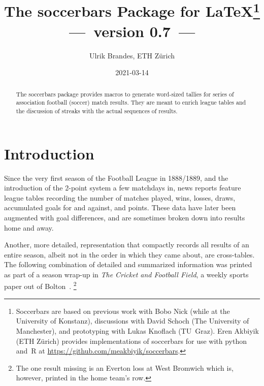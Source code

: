 \documentclass[a4paper,12pt]{ltxdoc}
\title{The \textsf{soccerbars} Package for \LaTeX\thanks{%
Soccerbars are based on
previous work with Bobo Nick (while at the University of Konstanz),
discussions with David Schoch (The University of Manchester),
and prototyping with Lukas Knoflach (TU~Graz).
Eren Akbiyik (ETH Z\"urich) provides implementations of soccerbars
for use with python and~R at \url{https://github.com/meakbiyik/soccerbars}.}\\
\normalsize ---~version 0.7~---}
\author{Ulrik Brandes, ETH Zürich}
\date{2021-03-14}
\begin{document}
\maketitle
\begin{abstract}
The \textsf{soccerbars} package provides macros
to generate word-sized tallies
for series of association football (soccer) match results. 
They are meant to enrich league tables and the discussion of streaks
with the actual sequences of results.
\end{abstract}
\tableofcontents
\clearpage

\section{Introduction}

Since the very first season of the Football League in 1888/1889, 
and the introduction of the 2-point system a few matchdays in,
news reports feature league tables 
recording the number of matches played,
wins, losses, draws, accumulated goals for and against, and points.
These data have later been augmented with goal differences,
and are sometimes broken down into results home and away.

Another, more detailed, representation
that compactly records all results of an entire season,
albeit not in the order in which they came about,
are cross-tables.
The following combination of detailed and summarized information
was printed as part of a season wrap-up in
\emph{The Cricket and Football Field},
a weekly sports paper out of Bolton~\cite{fl1889}.%
\footnote{The one result missing is an Everton loss at West Bromwich
which is, however, printed in the home team's row.}
 
\end{document}
